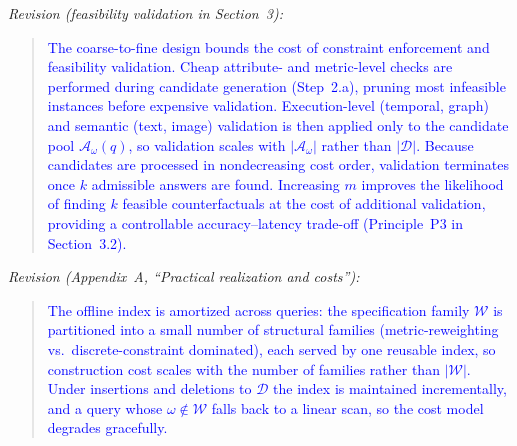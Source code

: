 \noindent\emph{Revision (feasibility validation in Section~3):}
\begin{quote}
\textcolor{blue}{The coarse-to-fine design bounds the cost of constraint enforcement and feasibility validation. Cheap attribute- and metric-level checks are performed during candidate generation (Step~2.a), pruning most infeasible instances before expensive validation. Execution-level (temporal, graph) and semantic (text, image) validation is then applied only to the candidate pool $\mathcal A_\omega(q)$, so validation scales with $|\mathcal A_\omega|$ rather than $|\mathcal D|$. Because candidates are processed in nondecreasing cost order, validation terminates once $k$ admissible answers are found. Increasing $m$ improves the likelihood of finding $k$ feasible counterfactuals at the cost of additional validation, providing a controllable accuracy--latency trade-off (Principle~P3 in Section~3.2).}
\end{quote}

\noindent\emph{Revision (Appendix~A, ``Practical realization and costs''):}
\begin{quote}
\textcolor{blue}{The offline index is amortized across queries: the specification family $\mathcal W$ is partitioned into a small number of structural families (metric-reweighting vs.\ discrete-constraint dominated), each served by one reusable index, so construction cost scales with the number of families rather than $|\mathcal W|$. Under insertions and deletions to $\mathcal D$ the index is maintained incrementally, and a query whose $\omega\notin\mathcal W$ falls back to a linear scan, so the cost model degrades gracefully.}
\end{quote}

